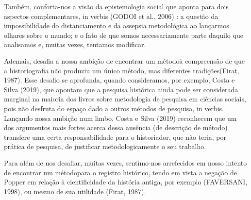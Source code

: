 \documentclass[
12pt,		%
openright,	%
twoside,  %
a4paper,			%
chapter=TITLE,		%
english,			%
french,				%
spanish,			%
brazil				%
]{USPSC-classe/USPSC}
\begin{document}
\noindent\begin{center}\mbox{\centering{}}\end{center}


Tamb\'em, conforta-nos a vis\~ao da epistemologia social que aponta para dois aspectos complementares, in verbis  (GODOI et al., 2006) : \textquotedbl a quest\~ao da impossibilidade do distanciamento e da assepsia metodol\'ogica ao lan\c{c}armos olhares sobre o mundo; e o fato de que somos necessariamente parte daquilo que analisamos e, muitas vezes, tentamos modificar\textquotedbl .








Ademais, desafia a nossa ambi\c{c}\~ao de \textquotedbl encontrar um m\'etodo\textquotedbl  \`a compreens\~ao de que a \textquotedbl historiografia n\~ao produziu um \'unico m\'etodo, mas diferentes tradi\c{c}\~oes\textquotedbl   (Firat, 1987).  Esse desafio se aprofunda, quando consideramos, por exemplo, Costa e Silva (2019), que apontam que a \textquotedbl pesquisa hist\'orica ainda pode ser considerada marginal na maioria dos livros sobre metodologia de pesquisa em ci\^encias sociais, pois n\~ao desfruta do espa\c{c}o dado a outros m\'etodos de pesquisa\textquotedbl , in verbis. Lan\c{c}ando nossa ambi\c{c}\~ao num limbo,  Costa e Silva (2019) reconhecem \textquotedbl que um dos argumentos mais fortes acerca dessa aus\^encia (de descri\c{c}\~ao de m\'etodo) transfere uma certa responsabilidade para o historiador, que n\~ao teria, por pr\'atica de pesquisa, de justificar metodologicamente o seu trabalho\textquotedbl .








Para al\'em de nos desafiar, muitas vezes, sent\'{\i}mo-nos arrefecidos em nosso intento de \textquotedbl encontrar um m\'etodo\textquotedbl  para o registro hist\'orico, tendo em vista a nega\c{c}\~ao de Popper em rela\c{c}\~ao \`a cientificidade da hist\'oria antiga, por exemplo (FAVERSANI, 1998), ou mesmo de sua utilidade (Firat, 1987).
\end{document}
